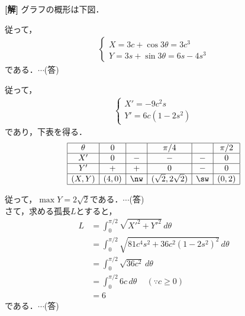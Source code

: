 \documentclass[a4j]{jarticle}
\begin{document}
\setlength{\columnseprule}{0.4pt}
\begin{multicols}{2}
{\bf[解]} \1 グラフの概形は下図．

従って，
     \begin{align*}
          \begin{cases}
          X=3c+\cos 3\theta=3c^3 \\
          Y=3s+\sin 3\theta=6s-4s^3
          \end{cases}
     \end{align*}     
である．$\cdots$(答)

従って，  
     \begin{align*}
          \begin{cases}
          X'=-9c^2s \\
          Y'=6c(1-2s^2)
          \end{cases}
     \end{align*}
であり，下表を得る．
      \begin{align*}
           \begin{array}{|c|c|c|c|c|c|}\hline
           \theta & 0     &      & \pi/4                     &      &\pi/2 \\  \hline
           X'       &0     & -     & -                          & -    & 0     \\ \hline
           Y'       & +    & +    & 0                         &  -   & 0    \\ \hline
           (X,Y) &(4,0) &\nw &(\sqrt{2},2\sqrt{2})&\sw &(0,2) \\ \hline
           \end{array}
      \end{align*}
      
 従って，$\max Y=2\sqrt{2}$である．$\cdots$(答)\\
 
 さて，求める孤長$L$とすると，
      \begin{align*}
      L&=\int_0^{\pi/2}\sqrt{X'^2+Y'^2}\,d\theta \\
      &=\int_0^{\pi/2}\sqrt{81c^4s^2+36c^2(1-2s^2)^2}\,d\theta \\
      &=\int_0^{\pi/2}\sqrt{36c^2}\,d\theta \\
      &=\int_0^{\pi/2}6c\,d\theta \,\,\,\,\,\,\, (\because c\ge0)\\
      &=6
      \end{align*}
 である．$\cdots$(答)     
\newpage
\end{multicols}
\end{document}
